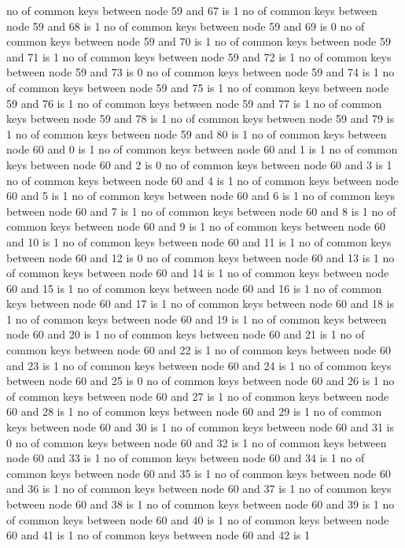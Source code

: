 no of common keys between node 59 and 67 is 1
no of common keys between node 59 and 68 is 1
no of common keys between node 59 and 69 is 0
no of common keys between node 59 and 70 is 1
no of common keys between node 59 and 71 is 1
no of common keys between node 59 and 72 is 1
no of common keys between node 59 and 73 is 0
no of common keys between node 59 and 74 is 1
no of common keys between node 59 and 75 is 1
no of common keys between node 59 and 76 is 1
no of common keys between node 59 and 77 is 1
no of common keys between node 59 and 78 is 1
no of common keys between node 59 and 79 is 1
no of common keys between node 59 and 80 is 1
no of common keys between node 60 and 0 is 1
no of common keys between node 60 and 1 is 1
no of common keys between node 60 and 2 is 0
no of common keys between node 60 and 3 is 1
no of common keys between node 60 and 4 is 1
no of common keys between node 60 and 5 is 1
no of common keys between node 60 and 6 is 1
no of common keys between node 60 and 7 is 1
no of common keys between node 60 and 8 is 1
no of common keys between node 60 and 9 is 1
no of common keys between node 60 and 10 is 1
no of common keys between node 60 and 11 is 1
no of common keys between node 60 and 12 is 0
no of common keys between node 60 and 13 is 1
no of common keys between node 60 and 14 is 1
no of common keys between node 60 and 15 is 1
no of common keys between node 60 and 16 is 1
no of common keys between node 60 and 17 is 1
no of common keys between node 60 and 18 is 1
no of common keys between node 60 and 19 is 1
no of common keys between node 60 and 20 is 1
no of common keys between node 60 and 21 is 1
no of common keys between node 60 and 22 is 1
no of common keys between node 60 and 23 is 1
no of common keys between node 60 and 24 is 1
no of common keys between node 60 and 25 is 0
no of common keys between node 60 and 26 is 1
no of common keys between node 60 and 27 is 1
no of common keys between node 60 and 28 is 1
no of common keys between node 60 and 29 is 1
no of common keys between node 60 and 30 is 1
no of common keys between node 60 and 31 is 0
no of common keys between node 60 and 32 is 1
no of common keys between node 60 and 33 is 1
no of common keys between node 60 and 34 is 1
no of common keys between node 60 and 35 is 1
no of common keys between node 60 and 36 is 1
no of common keys between node 60 and 37 is 1
no of common keys between node 60 and 38 is 1
no of common keys between node 60 and 39 is 1
no of common keys between node 60 and 40 is 1
no of common keys between node 60 and 41 is 1
no of common keys between node 60 and 42 is 1
